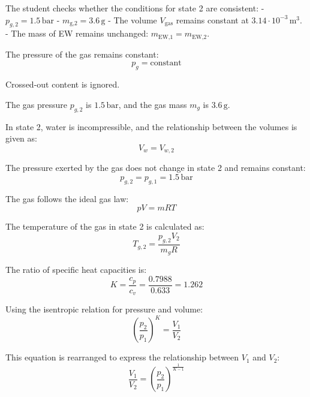 The student checks whether the conditions for state 2 are consistent:  
- \( p_{g,2} = 1.5 \, \text{bar} \)  
- \( m_{\text{g,2}} = 3.6 \, \text{g} \)  
- The volume \( V_{\text{gas}} \) remains constant at \( 3.14 \cdot 10^{-3} \, \text{m}^3 \).  
- The mass of EW remains unchanged: \( m_{\text{EW,1}} = m_{\text{EW,2}} \).  

The pressure of the gas remains constant:  
\[
p_g = \text{constant}
\]  

Crossed-out content is ignored.

The gas pressure \( p_{g,2} \) is \( 1.5 \, \text{bar} \), and the gas mass \( m_g \) is \( 3.6 \, \text{g} \).  

In state 2, water is incompressible, and the relationship between the volumes is given as:  
\[
V_w = V_{w,2}
\]  

The pressure exerted by the gas does not change in state 2 and remains constant:  
\[
p_{g,2} = p_{g,1} = 1.5 \, \text{bar}
\]  

The gas follows the ideal gas law:  
\[
pV = mRT
\]  

The temperature of the gas in state 2 is calculated as:  
\[
T_{g,2} = \frac{p_{g,2} V_2}{m_g R}
\]  

The ratio of specific heat capacities is:  
\[
K = \frac{c_p}{c_v} = \frac{0.7988}{0.633} = 1.262
\]  

Using the isentropic relation for pressure and volume:  
\[
\left( \frac{p_2}{p_1} \right)^K = \frac{V_1}{V_2}
\]  

This equation is rearranged to express the relationship between \( V_1 \) and \( V_2 \):  
\[
\frac{V_1}{V_2} = \left( \frac{p_2}{p_1} \right)^{\frac{1}{K-1}}
\]